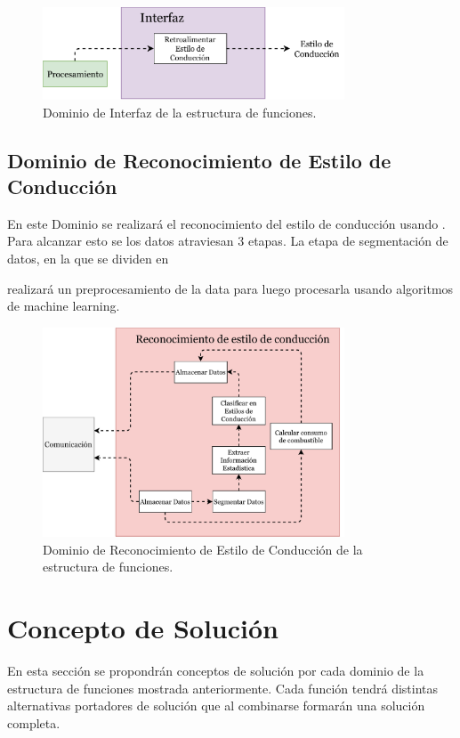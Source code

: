 \begin{figure}[htbp!]
\centering
\includegraphics[width=0.8\textwidth]{int.pdf}
\caption{Dominio de Interfaz de la estructura de funciones.}
\label{fig:int}
\end{figure}

\subsection{Dominio de Reconocimiento de Estilo de Conducción}
En este Dominio se realizará el reconocimiento del estilo de conducción usando . Para alcanzar esto se los datos atraviesan 3 etapas. La etapa de segmentación de datos, en la que se dividen en

realizará un preprocesamiento de la data para luego procesarla usando algoritmos de machine learning.

\begin{figure}[htbp!]
\centering
\includegraphics[width=0.8\textwidth]{rec.pdf}
\caption{Dominio de Reconocimiento de Estilo de Conducción de la estructura de funciones.}
\label{fig:3.7}
\end{figure}


\section{Concepto de Solución}
En esta sección se propondrán conceptos de solución por cada dominio de la estructura de funciones mostrada anteriormente. Cada función tendrá distintas alternativas portadores de solución que al combinarse formarán una solución completa.

